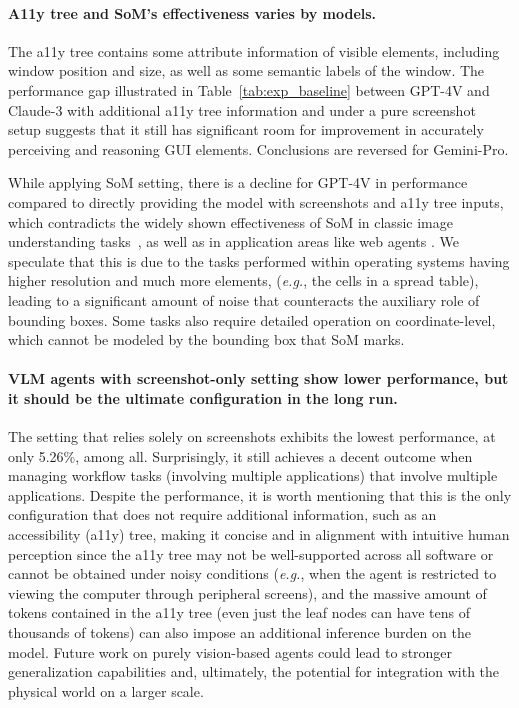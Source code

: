 \paragraph{A11y tree and SoM's effectiveness varies by models.} 
The a11y tree contains some attribute information of visible elements, including window position and size, as well as some semantic labels of the window. 
The performance gap illustrated in Table~\ref{tab:exp_baseline} between GPT-4V and Claude-3 with additional a11y tree information and under a pure screenshot setup suggests that it still has significant room for improvement in accurately perceiving and reasoning GUI elements.
Conclusions are reversed for Gemini-Pro.

While applying SoM setting, there is a decline for GPT-4V in performance compared to directly providing the model with screenshots and a11y tree inputs, which contradicts the widely shown effectiveness of SoM in classic image understanding tasks~\citep{yang2023set}, as well as in application areas like web agents \citep{zheng2024gpt, he2024webvoyager}. 
We speculate that this is due to the tasks performed within operating systems having higher resolution and much more elements, (\textit{e.g.}, the cells in a spread table), leading to a significant amount of noise that counteracts the auxiliary role of bounding boxes. 
Some tasks also require detailed operation on coordinate-level, which cannot be modeled by the bounding box that SoM marks.

\paragraph{VLM agents with screenshot-only setting show lower performance, but it should be the ultimate configuration in the long run.}
The setting that relies solely on screenshots exhibits the lowest performance, at only 5.26\%, among all. 
Surprisingly, it still achieves a decent outcome when managing workflow tasks (involving multiple applications) that involve multiple applications. 
Despite the performance, it is worth mentioning that this is the only configuration that does not require additional information, such as an accessibility (a11y) tree, making it concise and in alignment with intuitive human perception since the a11y tree may not be well-supported across all software or cannot be obtained under noisy conditions (\textit{e.g.}, when the agent is restricted to viewing the computer through peripheral screens), and the massive amount of tokens contained in the a11y tree (even just the leaf nodes can have tens of thousands of tokens) can also impose an additional inference burden on the model.
Future work on purely vision-based agents could lead to stronger generalization capabilities and, ultimately, the potential for integration with the physical world on a larger scale.
